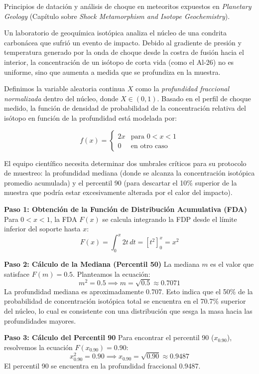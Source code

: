 Principios de datación y análisis de choque en meteoritos expuestos en \textit{Planetary Geology} (Capítulo sobre \textit{Shock Metamorphism and Isotope Geochemistry}).

Un laboratorio de geoquímica isotópica analiza el núcleo de una condrita carbonácea que sufrió un evento de impacto. Debido al gradiente de presión y temperatura generado por la onda de choque desde la costra de fusión hacia el interior, la concentración de un isótopo de corta vida (como el Al-26) no es uniforme, sino que aumenta a medida que se profundiza en la muestra. 

Definimos la variable aleatoria continua $X$ como la \textit{profundidad fraccional normalizada} dentro del núcleo, donde $X \in (0, 1)$. Basado en el perfil de choque medido, la función de densidad de probabilidad de la concentración relativa del isótopo en función de la profundidad está modelada por:

$$
f(x) = 
\begin{cases} 
2x & \text{para } 0 < x < 1 \\
0 & \text{en otro caso}
\end{cases}
$$

El equipo científico necesita determinar dos umbrales críticos para su protocolo de muestreo: la profundidad mediana (donde se alcanza la concentración isotópica promedio acumulada) y el percentil 90 (para descartar el 10\% superior de la muestra que podría estar excesivamente alterada por el calor del impacto).

\textbf{Paso 1: Obtención de la Función de Distribución Acumulativa (FDA)}
Para $0 < x < 1$, la FDA $F(x)$ se calcula integrando la FDP desde el límite inferior del soporte hasta $x$:
$$ F(x) = \int_{0}^{x} 2t \, dt = \left[ t^2 \right]_{0}^{x} = x^2 $$

\textbf{Paso 2: Cálculo de la Mediana (Percentil 50)}
La mediana $m$ es el valor que satisface $F(m) = 0.5$. Planteamos la ecuación:
$$ m^2 = 0.5 \implies m = \sqrt{0.5} \approx 0.7071 $$
La profundidad mediana es aproximadamente 0.707. Esto indica que el 50\% de la probabilidad de concentración isotópica total se encuentra en el 70.7\% superior del núcleo, lo cual es consistente con una distribución que sesga la masa hacia las profundidades mayores.

\textbf{Paso 3: Cálculo del Percentil 90}
Para encontrar el percentil 90 ($x_{0.90}$), resolvemos la ecuación $F(x_{0.90}) = 0.90$:
$$ x_{0.90}^2 = 0.90 \implies x_{0.90} = \sqrt{0.90} \approx 0.9487 $$
El percentil 90 se encuentra en la profundidad fraccional 0.9487. 

